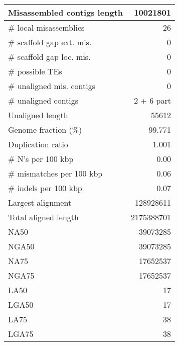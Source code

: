 \documentclass[12pt,a4paper]{article}
\begin{document}
\begin{table}[ht]
\begin{center}
\begin{tabular}{|l*{1}{|r}|}
Misassembled contigs length & 10021801 \\ \hline
\# local misassemblies & 26 \\ \hline
\# scaffold gap ext. mis. & 0 \\ \hline
\# scaffold gap loc. mis. & 0 \\ \hline
\# possible TEs & 0 \\ \hline
\# unaligned mis. contigs & 0 \\ \hline
\# unaligned contigs & 2 + 6 part \\ \hline
Unaligned length & 55612 \\ \hline
Genome fraction (\%) & 99.771 \\ \hline
Duplication ratio & 1.001 \\ \hline
\# N's per 100 kbp & 0.00 \\ \hline
\# mismatches per 100 kbp & 0.06 \\ \hline
\# indels per 100 kbp & 0.07 \\ \hline
Largest alignment & 128928611 \\ \hline
Total aligned length & 2175388701 \\ \hline
NA50 & 39073285 \\ \hline
NGA50 & 39073285 \\ \hline
NA75 & 17652537 \\ \hline
NGA75 & 17652537 \\ \hline
LA50 & 17 \\ \hline
LGA50 & 17 \\ \hline
LA75 & 38 \\ \hline
LGA75 & 38 \\ \hline
\end{tabular}
\end{center}
\end{table}
\end{document}

